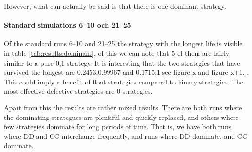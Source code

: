 
However, what can actually be said is that there is one dominant strategy.\mypar

\paragraph{Standard simulations 6--10 och 21--25}
Of the standard runs 6--10 and 21--25 the strategy with the longest life is visible in table \ref{tab:results:dominant}, of this we can note that 5 of them are fairly similar to a pure 0,1 strategy. It is interesting that the two strategies that have survived the longest are 0.2453,0.99967 and 0.1715,1 see figure x and figure x+1. \mypar. This could imply a benefit of float strategies compared to binary strategies. The most effective defective strategies are 0 strategies.

Apart from this the results are rather mixed results. There are both runs where the dominating strategues are plentiful and quickly replaced, and others where few strategies dominate for long periods of time. That is, we have both runs where DD and CC interchange frequently, and runs where DD dominate, and CC dominate. \mypar

